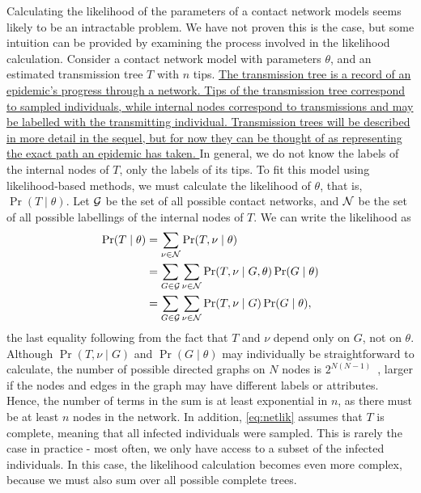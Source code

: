 Calculating the likelihood of the parameters of a contact network models seems
likely to be an intractable problem. We have not proven this is the case, but
some intuition can be provided by examining the process involved in the
likelihood calculation. Consider a contact network model with parameters
$\theta$, and an estimated transmission tree $T$ with $n$ tips.
{\color{blue}\uline{The transmission tree is a record of an epidemic's progress
through a network. Tips of the transmission tree correspond to sampled
individuals, while internal nodes correspond to transmissions and may be
labelled with the transmitting individual. Transmission trees will be described
in more detail in the sequel, but for now they can be thought of as
representing the exact path an epidemic has taken. }} In general, we do not
know the labels of the internal nodes of $T$, only the labels of its tips. To
fit this model using likelihood-based methods, we must calculate the likelihood
of $\theta$, that is, $\Pr(T \mid \theta)$. Let $\mathcal{G}$ be the set of all possible
contact networks, and $\mathcal{N}$ be the set of all possible labellings of the
internal nodes of $T$. We can write the likelihood as
\begin{align}
\begin{split}
  \label{eq:netlik}
  \Pr(T \mid \theta)
    &= \sum_{\nu \in \mathcal{N}} \Pr(T, \nu \mid \theta) \\
    &= \sum_{G \in \mathcal{G}} \sum_{\nu \in \mathcal{N}} \Pr(T, \nu \mid G, \theta) \Pr(G \mid \theta) \\
    &= \sum_{G \in \mathcal{G}} \sum_{\nu \in \mathcal{N}} \Pr(T, \nu \mid G) \Pr(G \mid \theta),
\end{split}
\end{align}
the last equality following from the fact that $T$ and $\nu$ depend only on
$G$, not on $\theta$. Although $\Pr(T, \nu \mid G)$ and $\Pr(G \mid \theta)$
may individually be straightforward to calculate, the number of possible
directed graphs on $N$ nodes is $2^{N(N-1)}$~\autocite{harary2014graphical},
larger if the nodes and edges in the graph may have different labels or
attributes. Hence, the number of terms in the sum is at least exponential in
$n$, as there must be at least $n$ nodes in the network. In addition,
\cref{eq:netlik} assumes that $T$ is complete, meaning that all infected
individuals were sampled. This is rarely the case in practice - most often, we
only have access to a subset of the infected individuals. In this case, the
likelihood calculation becomes even more complex, because we must also sum over
all possible complete trees.

